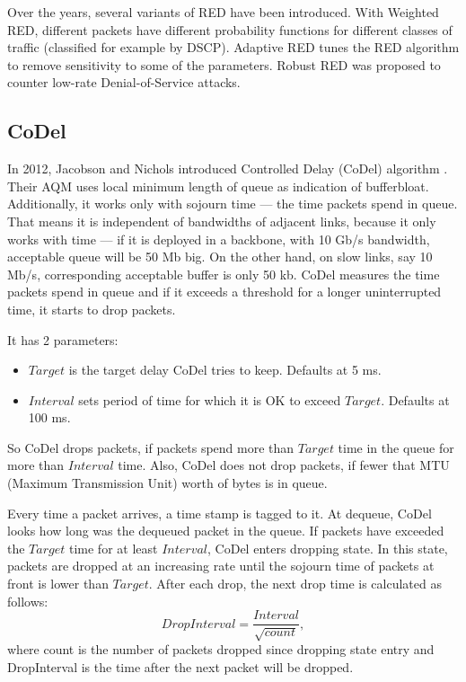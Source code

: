 Over the years, several variants of RED have been introduced. With Weighted RED, different packets have different probability functions for different classes of traffic (classified for example by DSCP). Adaptive RED \cite{Floyd01adaptivered:} tunes the RED algorithm to remove sensitivity to some of the parameters. Robust RED \cite{RRED} was proposed to counter low-rate Denial-of-Service attacks.

\subsection{CoDel}
\label{CoDel}
In 2012, Jacobson and Nichols introduced Controlled Delay (CoDel) algorithm \cite{CoDel}. Their AQM uses local minimum length of queue as indication of bufferbloat. Additionally, it works only with sojourn time --- the time packets spend in queue. That means it is independent of bandwidths of adjacent links, because it only works with time --- if it is deployed in a backbone, with 10 Gb/s bandwidth, acceptable queue will be 50 Mb big. On the other hand, on slow links, say 10 Mb/s, corresponding acceptable buffer is only 50 kb. CoDel measures the time packets spend in queue and if it exceeds a threshold for a longer uninterrupted time, it starts to drop packets.

It has 2 parameters:
\begin{itemize}
	\item $Target$ is the target delay CoDel tries to keep. Defaults at 5 ms.
	\item $Interval$ sets period of time for which it is OK to exceed $Target$. Defaults at 100 ms.
\end{itemize}
So CoDel drops packets, if packets spend more than $Target$ time in the queue for more than $Interval$ time. Also, CoDel does not drop packets, if fewer that MTU (Maximum Transmission Unit) worth of bytes is in queue.

Every time a packet arrives, a time stamp is tagged to it. At dequeue, CoDel looks how long was the dequeued packet in the queue. If packets have exceeded the $Target$ time for at least $Interval$, CoDel enters dropping state. In this state, packets are dropped at an increasing rate until the sojourn time of packets at front is lower than $Target$. After each drop, the next drop time is calculated as follows:
\[
  DropInterval = \frac{Interval}{\sqrt{count}},
\]
where count is the number of packets dropped since dropping state entry and DropInterval is the time after the next packet will be dropped.

